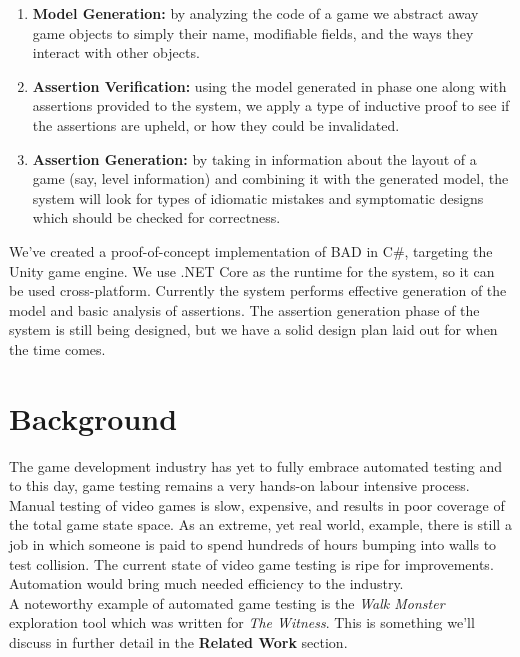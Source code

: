 \documentclass[letterpaper,twocolumn,10pt]{article}
\begin{document}
\begin{enumerate}
    \item{\textbf{Model Generation:}} by analyzing the code of a game we abstract away game objects to simply their name, modifiable fields, and the ways they interact with other objects. 
    \item {\textbf{Assertion Verification:}} using the model generated in phase one along with assertions provided to the system, we apply a type of inductive proof to see if the assertions are upheld, or how they could be invalidated.
    \item{\textbf{Assertion Generation:}} by taking in information about the layout of a game (say, level information) and combining it with the generated model, the system will look for types of idiomatic mistakes and symptomatic designs which should be checked for correctness.
\end{enumerate}

We've created a proof-of-concept implementation of BAD in C\#, targeting the Unity game engine. We use .NET Core as the runtime for the system, so it can be used cross-platform. Currently the system performs effective generation of the model and basic analysis of assertions. The assertion generation phase of the system is still being designed, but we have a solid design plan laid out for when the time comes. \\

\section{Background}

The game development industry has yet to fully embrace automated testing and to this day, game testing remains a very hands-on labour intensive process. Manual testing of video games is slow, expensive, and results in poor coverage of the total game state space. As an extreme, yet real world, example, there is still a job in which someone is paid to spend hundreds of hours bumping into walls to test collision. The current state of video game testing is ripe for improvements. Automation would bring much needed efficiency to the industry. \\

A noteworthy example of automated game testing is the \textit{Walk Monster}~\cite{WalkMonster} exploration tool which was written for \textit{The Witness}. This is something we'll discuss in further detail in the \textbf{Related Work} section.
\end{document}
